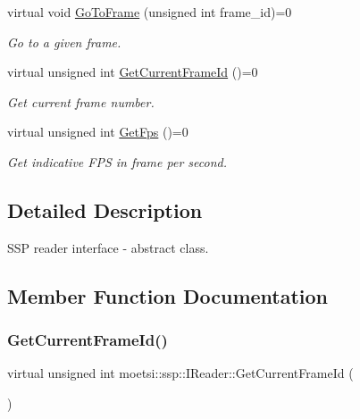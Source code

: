 \begin{DoxyCompactItemize}
virtual void \hyperlink{classmoetsi_1_1ssp_1_1IReader_a6f1be3c06538992cca6d550bd9566681}{Go\+To\+Frame} (unsigned int frame\+\_\+id)=0
\begin{DoxyCompactList}\small\item\em Go to a given frame. \end{DoxyCompactList}\item 
virtual unsigned int \hyperlink{classmoetsi_1_1ssp_1_1IReader_ac292d83eb06dee277baaa06e281a562d}{Get\+Current\+Frame\+Id} ()=0
\begin{DoxyCompactList}\small\item\em Get current frame number. \end{DoxyCompactList}\item 
virtual unsigned int \hyperlink{classmoetsi_1_1ssp_1_1IReader_a9f6a8650ca290b011b8e5451eeae9f32}{Get\+Fps} ()=0
\begin{DoxyCompactList}\small\item\em Get indicative F\+PS in frame per second. \end{DoxyCompactList}\end{DoxyCompactItemize}


\subsection{Detailed Description}
S\+SP reader interface -\/ abstract class. 

\subsection{Member Function Documentation}
\mbox{\label{classmoetsi_1_1ssp_1_1IReader_ac292d83eb06dee277baaa06e281a562d}} 
\subsubsection{\texorpdfstring{Get\+Current\+Frame\+Id()}{GetCurrentFrameId()}\hspace{0.1cm}{\footnotesize\ttfamily [1/2]}}
{\footnotesize\ttfamily virtual unsigned int moetsi\+::ssp\+::\+I\+Reader\+::\+Get\+Current\+Frame\+Id (\begin{DoxyParamCaption}{ }\end{DoxyParamCaption})\hspace{0.3cm}{\ttfamily [pure virtual]}}



